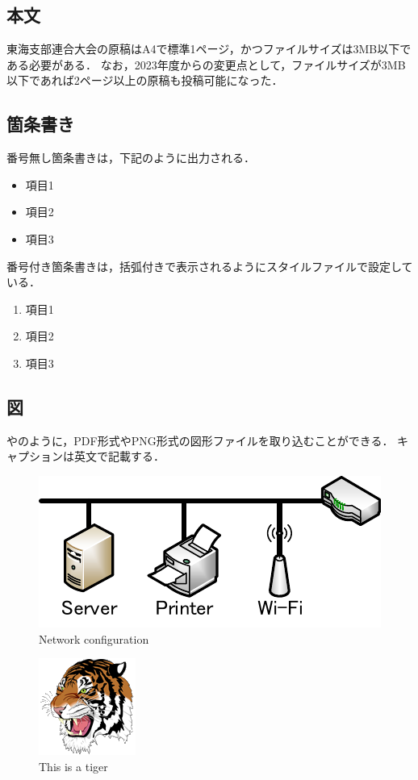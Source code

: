 \documentclass[a4j,9pt,twocolumn,uplatex]{jsarticle}
\begin{document}
\subsection{本文}
東海支部連合大会の原稿はA4で標準1ページ，かつファイルサイズは3MB以下である必要がある．
なお，2023年度からの変更点として，ファイルサイズが3MB以下であれば2ページ以上の原稿も投稿可能になった．

\subsection{箇条書き}
番号無し箇条書きは，下記のように出力される．
\begin{itemize}
    \item 項目1
    \item 項目2
    \item 項目3
\end{itemize}

番号付き箇条書きは，括弧付きで表示されるようにスタイルファイルで設定している．
\begin{enumerate}
    \item 項目1
    \item 項目2
    \item 項目3
\end{enumerate}

\subsection{図}
やのように，PDF形式やPNG形式の図形ファイルを取り込むことができる．
キャプションは英文で記載する．

\begin{figure}[tb]
    \centering
    \includegraphics[width=0.5\linewidth,clip]{fig/network.pdf}
    \caption{Network configuration}
    \label{fig:network}
\end{figure}

\begin{figure}[tb]
    \centering
    \includegraphics[scale=0.95,clip]{fig/tiger.png}
    \caption{This is a tiger}
    \label{fig:tiger}
\end{figure}
\end{document}
